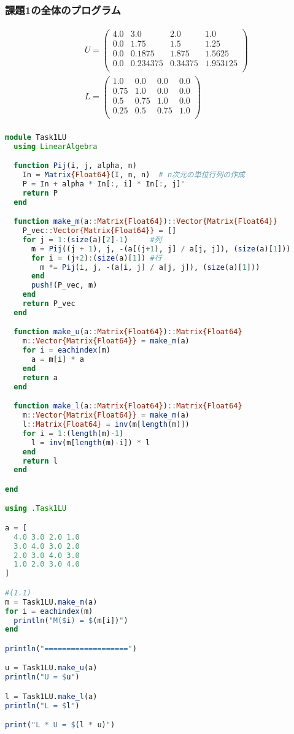 \documentclass[uplatex, dvipdfmx, a4j,11pt]{jsarticle}
\begin{document}
\subsubsection*{課題1の全体のプログラム}
\begin{eqnarray*}
  &&U =
  \begin{pmatrix}
    4.0 & 3.0 & 2.0 & 1.0\\
    0.0 & 1.75 & 1.5 & 1.25\\
    0.0 & 0.1875 & 1.875 & 1.5625\\
    0.0 & 0.234375 & 0.34375 & 1.953125\\
  \end{pmatrix}\\
  &&L =
  \begin{pmatrix}
    1.0 & 0.0 & 0.0 & 0.0\\
    0.75 & 1.0 & 0.0 & 0.0\\
    0.5 & 0.75 & 1.0 & 0.0\\
    0.25 & 0.5 & 0.75 & 1.0\\
  \end{pmatrix}\\
\end{eqnarray*}

\begin{lstlisting}[title={課題1の全体のプログラム}, label=code:in, language=Julia]
module Task1LU
  using LinearAlgebra

  function Pij(i, j, alpha, n)
    In = Matrix{Float64}(I, n, n)  # n次元の単位行列の作成
    P = In + alpha * In[:, i] * In[:, j]'
    return P
  end

  function make_m(a::Matrix{Float64})::Vector{Matrix{Float64}}
    P_vec::Vector{Matrix{Float64}} = []
    for j = 1:(size(a)[2]-1)     #列
      m = Pij((j + 1), j, -(a[(j+1), j] / a[j, j]), (size(a)[1]))
      for i = (j+2):(size(a)[1]) #行
        m *= Pij(i, j, -(a[i, j] / a[j, j]), (size(a)[1]))
      end
      push!(P_vec, m)
    end
    return P_vec
  end

  function make_u(a::Matrix{Float64})::Matrix{Float64}
    m::Vector{Matrix{Float64}} = make_m(a)
    for i = eachindex(m)
      a = m[i] * a
    end
    return a
  end

  function make_l(a::Matrix{Float64})::Matrix{Float64}
    m::Vector{Matrix{Float64}} = make_m(a)
    l::Matrix{Float64} = inv(m[length(m)])
    for i = 1:(length(m)-1)
      l = inv(m[length(m)-i]) * l
    end
    return l
  end

end

using .Task1LU

a = [
  4.0 3.0 2.0 1.0
  3.0 4.0 3.0 2.0
  2.0 3.0 4.0 3.0
  1.0 2.0 3.0 4.0
]

#(1.1)
m = Task1LU.make_m(a)
for i = eachindex(m)
  println("M($i) = $(m[i])")
end

println("===================")

u = Task1LU.make_u(a)
println("U = $u")

l = Task1LU.make_l(a)
println("L = $l")

print("L * U = $(l * u)")
\end{lstlisting}
\end{document}
